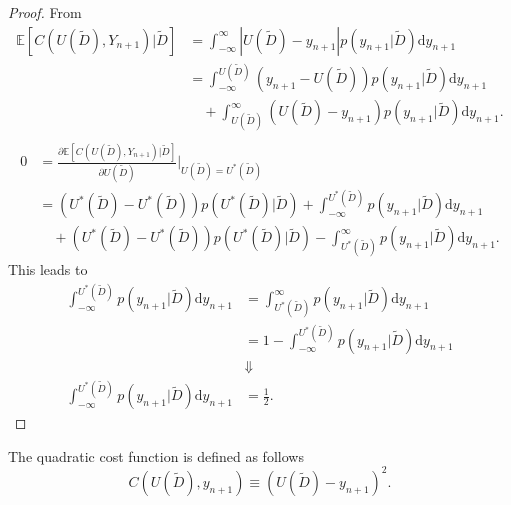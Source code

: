 \begin{proof}
	From 
	\begin{equation}
		\begin{split}
			\mathbb{E}[C(U(\tilde{D}), Y_{n+1})|\tilde{D}] &= \int_{-\infty}^{\infty} |U(\tilde{D})-y_{n+1}| p(y_{n+1}|\tilde{D})\mathrm{d}y_{n+1}\\
			&= \int_{-\infty}^{U(\tilde{D})} (y_{n+1}-U(\tilde{D}))p(y_{n+1}|\tilde{D})\mathrm{d}y_{n+1}\\
			&\quad+\int_{U(\tilde{D})}^\infty  (U(\tilde{D})-y_{n+1})p(y_{n+1}|\tilde{D})\mathrm{d}y_{n+1}.\\
		\end{split}
	\end{equation}
	\begin{equation}
		\begin{split}
			0 &=\frac{\partial \mathbb{E}[C(U(\tilde{D}), Y_{n+1})|\tilde{D}]}{\partial U(\tilde{D})}\bigg|_{U(\tilde{D})=U^*(\tilde{D})}\\
			&= (U^*(\tilde{D})-U^*(\tilde{D}))p(U^*(\tilde{D})|\tilde{D})+\int_{-\infty}^{U^*(\tilde{D})} p(y_{n+1}|\tilde{D})\mathrm{d}y_{n+1}\\
			&\quad+(U^*(\tilde{D})-U^*(\tilde{D}))p(U^*(\tilde{D})|\tilde{D})-\int_{U^*(\tilde{D})}^\infty  p(y_{n+1}|\tilde{D})\mathrm{d}y_{n+1}.
		\end{split}
	\end{equation}
	This leads to
	\begin{equation}
		\begin{split}
			\int_{-\infty}^{U^*(\tilde{D})} p(y_{n+1}|\tilde{D}) \mathrm{d}y_{n+1} &= \int_{U^*(\tilde{D})}^\infty p(y_{n+1}|\tilde{D}) \mathrm{d}y_{n+1}\\
			&= 1- \int_{-\infty}^{U^*(\tilde{D})} p(y_{n+1}|\tilde{D})\mathrm{d}y_{n+1}\\
			&\Downarrow\\
			\int_{-\infty}^{U^*(\tilde{D})} p(y_{n+1}|\tilde{D})\mathrm{d}y_{n+1}& = \frac{1}{2}.
		\end{split}
	\end{equation}	
\end{proof}

\begin{definition}
	\label{def:quadratic_cost}
	The quadratic cost function is defined as follows
	\begin{equation}
		C(U(\tilde{D}),y_{n+1}) \equiv (U(\tilde{D})-y_{n+1})^2.
	\end{equation}
\end{definition}

